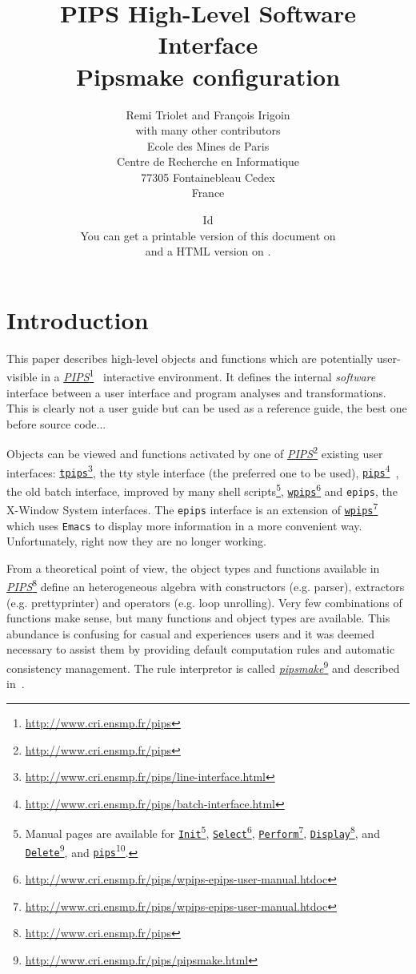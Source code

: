 \documentclass[a4paper]{report}
\title{PIPS High-Level Software Interface \\
    Pipsmake configuration}
\author{Remi Triolet and Fran\c{c}ois Irigoin\\
  with many other contributors\\
        Ecole des Mines de Paris \\
        Centre de Recherche en Informatique \\
        77305 Fontainebleau Cedex \\
        France \\}
\date{
  $~$Id$~$\\[3cm]
  You can get a printable version of this document on\\
  \PipsPIPSmakePDF and a HTML version on \PipsPIPSmakeHTDOC.
}
\newenvironment{PipsExample}{\VerbatimEnvironment
\begin{Verbatim}}{\end{Verbatim}}
\newcommand{\LINK}[2]{\href{#2}{#1}\footnote{\url{#2}}\xspace}
\newcommand{\PIPS}{\LINK{\emph{PIPS}}{http://www.cri.ensmp.fr/pips}}
\newcommand{\PIPSMAKE}{\LINK{\emph{pipsmake}}{http://www.cri.ensmp.fr/pips/pipsmake.html}\xspace}
\newcommand{\pips}{\LINK{\texttt{pips}}{http://www.cri.ensmp.fr/pips/batch-interface.html}}
\newcommand{\TPIPS}{\LINK{\texttt{tpips}}{http://www.cri.ensmp.fr/pips/line-interface.html}}
\newcommand{\WPIPS}{\LINK{\texttt{wpips}}{http://www.cri.ensmp.fr/pips/wpips-epips-user-manual.htdoc}}
\newcommand{\Init}{\LINK{\texttt{Init}}{http://www.cri.ensmp.fr/pips/Init.html}}
\newcommand{\Select}{\LINK{\texttt{Select}}{http://www.cri.ensmp.fr/pips/Select.html}}
\newcommand{\Perform}{\LINK{\texttt{Perform}}{http://www.cri.ensmp.fr/pips/Perform.html}}
\newcommand{\Display}{\LINK{\texttt{Display}}{http://www.cri.ensmp.fr/pips/Display.html}}
\newcommand{\Delete}{\LINK{\texttt{Delete}}{http://www.cri.ensmp.fr/pips/Delete.html}}
\begin{document}
\thispagestyle{empty}

\maketitle



\newenvironment{PipsMenu}[1]{\par{\bf #1}\\\begin{alltt}}{\end{alltt}}



\chapter{Introduction}

This paper describes high-level objects and functions which are
potentially user-visible in a \PIPS{}~\cite{IJT91} interactive environment.
It defines the internal {\em software} interface between a user interface and
program analyses and transformations. This is clearly not a user guide
but can be used as a reference guide, the best one before source code...

Objects can be viewed and functions activated by one of \PIPS{}
existing user interfaces: \TPIPS{}, the tty style interface (the preferred
one to be used),
\pips{}~\cite{BIJ91}, the old batch interface, improved by many shell
scripts\footnote{Manual pages are available for \Init{}, \Select{},
  \Perform{}, \Display{}, and \Delete{}, and \pips{}.}, \WPIPS{} and
{\tt epips}, the X-Window System interfaces.  The {\tt epips}
interface is an extension of \WPIPS{} which uses {\tt Emacs} to
display more information in a more convenient way. Unfortunately, right
now they are no longer working.

From a theoretical point of view, the object types and functions available
in \PIPS{} define an heterogeneous algebra with constructors (e.g. parser),
extractors (e.g. prettyprinter) and operators (e.g. loop unrolling).  Very
few combinations of functions make sense, but many functions and object
types are available. This abundance is confusing for casual and
experiences users and it was deemed necessary to assist them by providing
default computation rules and automatic consistency management. The rule
interpretor is called \PIPSMAKE{} and described in~\cite{B91}.
\end{document}
